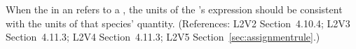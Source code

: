 When the  in an \InitialAssignment refers to a \Species,
the units of the \InitialAssignment's  expression should be
consistent with the units of that species' quantity.  (References:
L2V2 Section~4.10.4; L2V3 Section~4.11.3; L2V4 Section~4.11.3; L2V5 Section~\ref{sec:assignmentrule}.)
